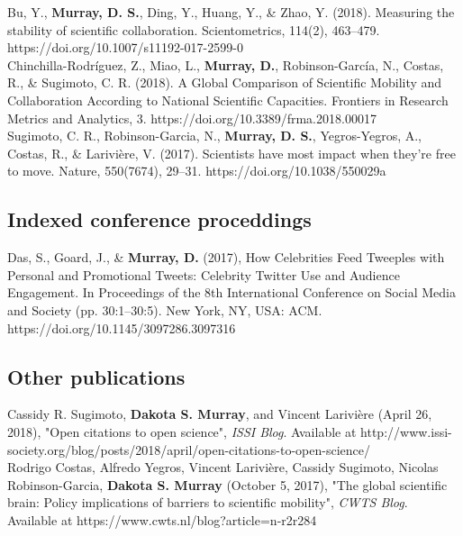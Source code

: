 \documentclass[10pt, a4paper]{article}
\newcommand{\years}[1]{\marginnote{\scriptsize #1}}
\begin{document}
\years{2018}Bu, Y., \textbf{Murray, D. S.}, Ding, Y., Huang, Y., \& Zhao, Y. (2018). Measuring the stability of scientific collaboration. Scientometrics, 114(2), 463–479. https://doi.org/10.1007/s11192-017-2599-0\\

\years{2018}Chinchilla-Rodríguez, Z., Miao, L., \textbf{Murray, D.}, Robinson-García, N., Costas, R., \& Sugimoto, C. R. (2018). A Global Comparison of Scientific Mobility and Collaboration According to National Scientific Capacities. Frontiers in Research Metrics and Analytics, 3. https://doi.org/10.3389/frma.2018.00017\\

\years{2017}Sugimoto, C. R., Robinson-Garcia, N., \textbf{Murray, D. S.}, Yegros-Yegros, A., Costas, R., \& Larivière, V. (2017). Scientists have most impact when they’re free to move. Nature, 550(7674), 29–31. https://doi.org/10.1038/550029a\\

\subsection*{Indexed conference proceddings}
\noindent
\years{2017}Das, S., Goard, J., \& \textbf{Murray, D.} (2017), How Celebrities Feed Tweeples with Personal and Promotional Tweets: Celebrity Twitter Use and Audience Engagement. In Proceedings of the 8th International Conference on Social Media and Society (pp. 30:1–30:5). New York, NY, USA: ACM. https://doi.org/10.1145/3097286.3097316\\

\subsection*{Other publications}
\noindent

\years{2018} Cassidy R. Sugimoto, \textbf{Dakota S. Murray}, and Vincent Larivière (April 26, 2018), "Open citations to open science", \emph{ISSI Blog}. Available at http://www.issi-society.org/blog/posts/2018/april/open-citations-to-open-science/\\

\years{2017} Rodrigo Costas, Alfredo Yegros, Vincent Larivière, Cassidy Sugimoto, Nicolas Robinson-Garcia, \textbf{Dakota S. Murray} (October 5, 2017), "The global scientific brain: Policy implications of barriers to scientific mobility", \emph{CWTS Blog}. Available at https://www.cwts.nl/blog?article=n-r2r284\\
\\
\end{document}
